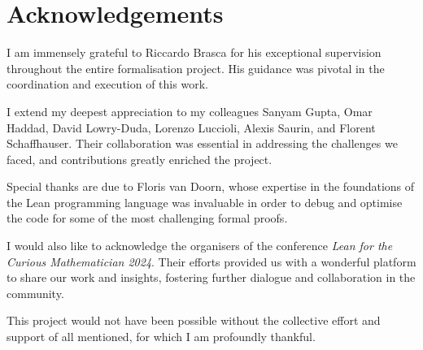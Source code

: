 \chapter*{Acknowledgements}







I am immensely grateful to Riccardo Brasca for his exceptional supervision throughout the entire
formalisation project.
His guidance was pivotal in the coordination and execution of this work.

I extend my deepest appreciation to my colleagues Sanyam Gupta, Omar Haddad, David Lowry-Duda,
Lorenzo Luccioli, Alexis Saurin, and Florent Schaffhauser.
Their collaboration was essential in addressing the challenges we faced, and
contributions greatly enriched the project.

Special thanks are due to Floris van Doorn, whose expertise in the foundations of the Lean
programming language was invaluable in order to debug and optimise the code for some of the most
challenging formal proofs.

I would also like to acknowledge the organisers of the conference
\textit{Lean for the Curious Mathematician 2024}.
Their efforts provided us with a wonderful platform to share our work and insights,
fostering further dialogue and collaboration in the community.

This project would not have been possible without the collective effort and support of all mentioned,
for which I am profoundly thankful.